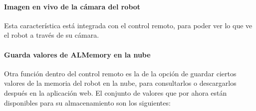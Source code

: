\paragraph{Imagen en vivo de la cámara del robot}
\label{\detokenize{users_docs:imagen-en-vivo-de-la-camara-del-robot}}
Esta característica está integrada con el control remoto, para poder ver lo
que ve el robot a través de su cámara.


\paragraph{Guarda valores de ALMemory en la nube}
\label{\detokenize{users_docs:guarda-valores-de-almemory-en-la-nube}}
Otra función dentro del control remoto es la de la opción de guardar ciertos
valores de la memoria del robot en la nube, para consultarlos o descargarlos
después en la aplicación web. El conjunto de valores que por ahora
están disponibles para su almacenamiento son los siguientes:

